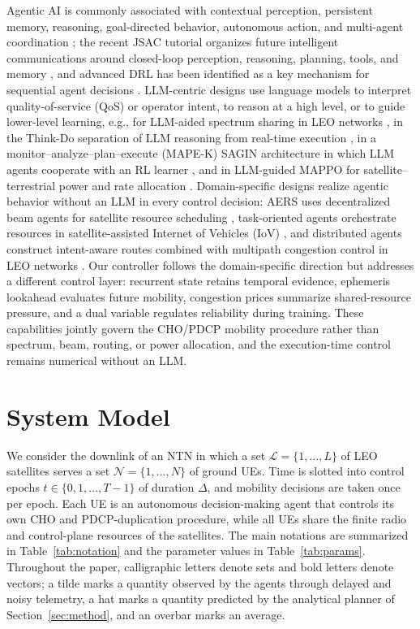 \documentclass[journal]{IEEEtran}
\newcommand{\Lset}{\mathcal{L}}
\newcommand{\Nset}{\mathcal{N}}
\begin{document}
Agentic AI is commonly associated with contextual perception, persistent
memory, reasoning, goal-directed behavior, autonomous action, and multi-agent
coordination \cite{sapkota2026agentic,zhang2026edgeagentic}; the recent JSAC
tutorial organizes future intelligent communications around closed-loop
perception, reasoning, planning, tools, and memory \cite{jiang2026tutorial},
and advanced DRL has been identified as a key mechanism for sequential agent
decisions \cite{zheng2026agenticdrl}. LLM-centric designs use language models
to interpret quality-of-service (QoS) or operator intent, to reason at a high level, or to guide
lower-level learning, e.g., for LLM-aided spectrum sharing in LEO networks
\cite{ni2026llmleo}, in the Think-Do separation of LLM reasoning from real-time
execution \cite{cao2026thinkdo}, in a monitor--analyze--plan--execute
(MAPE-K) SAGIN architecture in which LLM agents cooperate with an RL learner
\cite{zhang2026saginagentic}, and in LLM-guided MAPPO for satellite--terrestrial
power and rate allocation \cite{hu2026llmmappo}. Domain-specific designs
realize agentic behavior without an LLM in every control decision: AERS uses
decentralized beam agents for satellite resource scheduling
\cite{shen2026aers}, task-oriented agents orchestrate resources in
satellite-assisted Internet of Vehicles (IoV) \cite{xie2026agenticiov}, and
distributed agents construct intent-aware routes combined with multipath
congestion control in LEO networks \cite{zhang2026agenticmultipath}. Our
controller follows the domain-specific direction but addresses a different
control layer: recurrent state retains temporal evidence, ephemeris lookahead
evaluates future mobility, congestion prices summarize shared-resource
pressure, and a dual variable regulates reliability during training. These
capabilities jointly govern the CHO/PDCP mobility procedure rather than
spectrum, beam, routing, or power allocation, and the execution-time control
remains numerical without an LLM.

\section{System Model}
\label{sec:system}

We consider the downlink of an NTN in which a set $\Lset=\{1,\dots,L\}$ of
LEO satellites serves a set $\Nset=\{1,\dots,N\}$ of ground UEs. Time is
slotted into control epochs $t\in\{0,1,\dots,T-1\}$ of duration $\Delta$,
and mobility decisions are taken once per epoch. Each UE is an autonomous
decision-making agent that controls its own CHO and PDCP-duplication
procedure, while all UEs share the finite radio and control-plane resources
of the satellites. The main notations are summarized in
Table~\ref{tab:notation} and the parameter values in Table~\ref{tab:params}.
Throughout the paper, calligraphic letters denote sets and bold letters
denote vectors; a tilde marks a quantity observed by the agents through
delayed and noisy telemetry, a hat marks a quantity predicted by the
analytical planner of Section~\ref{sec:method}, and an overbar marks an
average.
\end{document}
